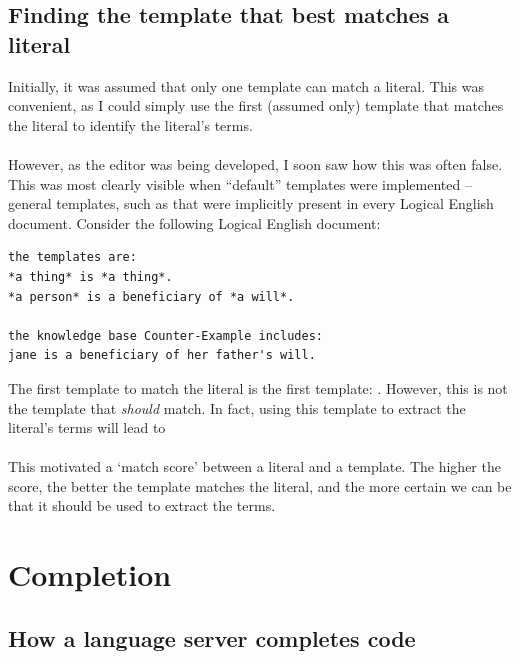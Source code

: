 \documentclass[../main.tex]{subfiles}
\begin{document}
\subsection{Finding the template that best matches a literal}
Initially, it was assumed that only one template can match a literal. This was convenient, as I could simply use the first (assumed only) template that matches the literal to identify the literal's terms. 
\\
\\
However, as the editor was being developed, I soon saw how this was often false. This was most clearly visible when ``default'' templates were implemented -- general templates, such as  that were implicitly present in every Logical English document. Consider the following Logical English document:
\begin{lstlisting}[langage={LE}]
the templates are:
*a thing* is *a thing*.
*a person* is a beneficiary of *a will*.

the knowledge base Counter-Example includes:
jane is a beneficiary of her father's will.
\end{lstlisting}
The first template to match the literal  is the first template: . However, this is not the template that \textit{should} match. In fact, using this template to extract the literal's terms will lead to 
\\ 
\\
This motivated a `match score' between a literal and a template. The higher the score, the better the template matches the literal, and the more certain we can be that it should be used to extract the terms.
%
%
%
\section{Completion}
\subsection{How a language server completes code}
\end{document}
